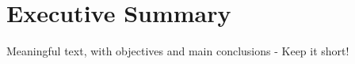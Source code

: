 
\thispagestyle{acknowledgements}
\section*{Executive Summary}

Meaningful text, with objectives and main conclusions - Keep it short!